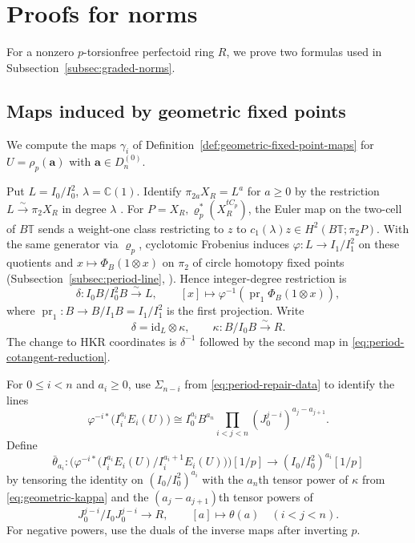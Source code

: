 \section{Proofs for norms}
\label{app:operation-foundations}

For a nonzero $p$-torsionfree perfectoid ring $R$, we prove two formulas
used in Subsection~\ref{subsec:graded-norms}.

\subsection{Maps induced by geometric fixed points}
\label{app:ghosts}

We compute the maps $\gamma_i$ of
Definition~\ref{def:geometric-fixed-point-maps}
for $U=\rho_p(\mathbf a)$ with $\mathbf a\in D_n^{(0)}$.

Put $L=I_0/I_0^2$, $\lambda=\mathbb C(1)$. Identify $\pi_{2a}X_R=L^a$ for $a\ge0$
by the restriction $L\xrightarrow{\sim}\pi_2X_R$ in degree $\lambda$
\cite[Example~3.2 and Remark~3.5]{SulymaNew}.
For $P=X_R,\varrho_p^*(X_R^{tC_p})$, the Euler map on the two-cell of
$B\mathbb T$ sends a weight-one class restricting to $z$ to
$c_1(\lambda)z\in H^2(B\mathbb T;\pi_2P)$.
With the same generator via $\varrho_p$, cyclotomic Frobenius induces
$\varphi:L\to I_1/I_1^2$ on these quotients and
$x\mapsto\Phi_B(1\otimes x)$ on $\pi_2$ of circle homotopy fixed points
(Subsection~\ref{subsec:period-line}, \cite[Proposition~6.2 and Remark~6.6]{BMS}).
Hence integer-degree restriction is
\[
\delta:I_0B/I_0^2B\xrightarrow{\sim}L,\qquad
[x]\longmapsto\varphi^{-1}\!\left(\operatorname{pr}_1\Phi_B(1\otimes x)\right),
\]
where $\operatorname{pr}_1:B\to B/I_1B=I_1/I_1^2$ is the first projection.
Write
\begin{equation}\label{eq:geometric-kappa}
\delta=\mathrm{id}_L\otimes\kappa,\qquad
\kappa:B/I_0B\xrightarrow{\sim}R.
\end{equation}
The change to HKR coordinates is $\delta^{-1}$ followed by the second
map in \eqref{eq:period-cotangent-reduction}.

\begin{definition}\label{def:geometric-fixed-point-coefficients}
For $0\le i<n$ and $a_i\ge0$, use $\Sigma_{n-i}$ from \eqref{eq:period-repair-data} to identify the lines
\[
\varphi^{-i*}\bigl(I_i^{a_i}E_i(U)\bigr)
\cong I_0^{a_i}B^{a_n}
\prod_{i<j<n}(J_0^{j-i})^{a_j-a_{j+1}}.
\]
Define
\[
\bar\theta_{a_i}:
\bigl(\varphi^{-i*}\bigl(I_i^{a_i}E_i(U)/I_i^{a_i+1}E_i(U)\bigr)\bigr)[1/p]
\longrightarrow (I_0/I_0^2)^{a_i}[1/p]
\]
by tensoring the identity on $(I_0/I_0^2)^{a_i}$ with the
$a_n$th tensor power of $\kappa$ from \eqref{eq:geometric-kappa} and the
$(a_j-a_{j+1})$th tensor powers of
\[
J_0^{j-i}/I_0J_0^{j-i}\longrightarrow R,
\qquad [a]\longmapsto\theta(a)
\quad(i<j<n).
\]
For negative powers, use the duals of the inverse maps after
inverting $p$.
\end{definition}

